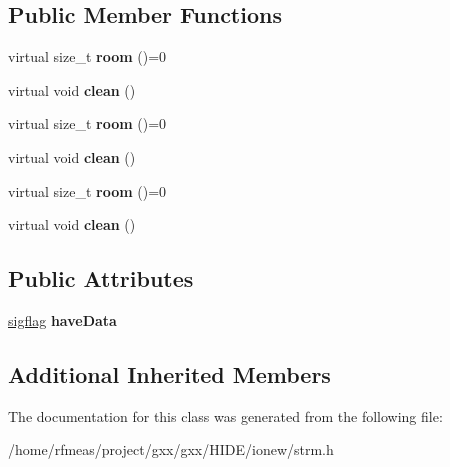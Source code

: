 \subsection*{Public Member Functions}
\begin{DoxyCompactItemize}
\item 
virtual size\+\_\+t {\bfseries room} ()=0\hypertarget{classgxx_1_1io_1_1lstrmout_a6ff1d6f622f56335197b34ff4a1e3b12}{}\label{classgxx_1_1io_1_1lstrmout_a6ff1d6f622f56335197b34ff4a1e3b12}

\item 
virtual void {\bfseries clean} ()\hypertarget{classgxx_1_1io_1_1lstrmout_abe3ebd1703a208c1c6aa73f3c4501723}{}\label{classgxx_1_1io_1_1lstrmout_abe3ebd1703a208c1c6aa73f3c4501723}

\item 
virtual size\+\_\+t {\bfseries room} ()=0\hypertarget{classgxx_1_1io_1_1lstrmout_a6ff1d6f622f56335197b34ff4a1e3b12}{}\label{classgxx_1_1io_1_1lstrmout_a6ff1d6f622f56335197b34ff4a1e3b12}

\item 
virtual void {\bfseries clean} ()\hypertarget{classgxx_1_1io_1_1lstrmout_abe3ebd1703a208c1c6aa73f3c4501723}{}\label{classgxx_1_1io_1_1lstrmout_abe3ebd1703a208c1c6aa73f3c4501723}

\item 
virtual size\+\_\+t {\bfseries room} ()=0\hypertarget{classgxx_1_1io_1_1lstrmout_a6ff1d6f622f56335197b34ff4a1e3b12}{}\label{classgxx_1_1io_1_1lstrmout_a6ff1d6f622f56335197b34ff4a1e3b12}

\item 
virtual void {\bfseries clean} ()\hypertarget{classgxx_1_1io_1_1lstrmout_abe3ebd1703a208c1c6aa73f3c4501723}{}\label{classgxx_1_1io_1_1lstrmout_abe3ebd1703a208c1c6aa73f3c4501723}

\end{DoxyCompactItemize}
\subsection*{Public Attributes}
\begin{DoxyCompactItemize}
\item 
\hyperlink{classgxx_1_1sigflag}{sigflag} {\bfseries have\+Data}\hypertarget{classgxx_1_1io_1_1lstrmout_a9e3a307517935ba31cbe2cfd21a8fa08}{}\label{classgxx_1_1io_1_1lstrmout_a9e3a307517935ba31cbe2cfd21a8fa08}

\end{DoxyCompactItemize}
\subsection*{Additional Inherited Members}


The documentation for this class was generated from the following file\+:\begin{DoxyCompactItemize}
\item 
/home/rfmeas/project/gxx/gxx/\+H\+I\+D\+E/ionew/strm.\+h\end{DoxyCompactItemize}
